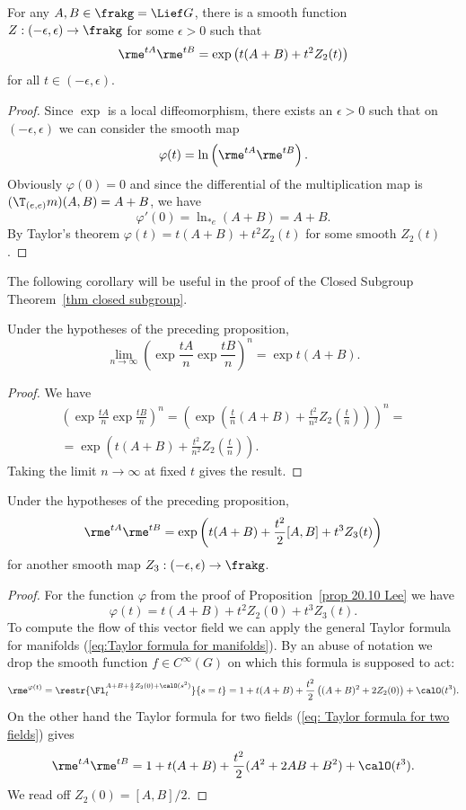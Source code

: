 \begin{prop}\label{prop 20.10 Lee}
    For any $A,B\in\frakg=\Lief G$, there is a smooth function $Z:(-\epsilon,\epsilon)\to \frakg$ for some $\epsilon>0$ such that
    \[\rme^{tA}\rme^{tB}=\exp\left(t(A+B)+t^2Z_2(t)\right)\]
    for all $t\in(-\epsilon,\epsilon)$.
\end{prop}
\begin{proof}
    Since $\exp$ is a local diffeomorphism, there exists an $\epsilon>0$ such that on $(-\epsilon,\epsilon)$ we can consider the smooth map
    \[\varphi(t)=\ln\left(\rme^{tA}\rme^{tB}\right).\]
    Obviously $\varphi(0)=0$ and since the differential of the multiplication map is $(\T_{(e,e)}m)(A,B)=A+B$, we have
    \[\varphi'(0)=\ln_{\ast e}(A+B)=A+B.\]
    By Taylor's theorem $\varphi(t)=t(A+B)+t^2Z_2(t)$ for some smooth $Z_2(t)$.
\end{proof}
The following corollary will be useful in the proof of the Closed Subgroup Theorem~\ref{thm closed subgroup}.
\begin{cor}\label{cor 20.11 Lee}
    Under the hypotheses of the preceding proposition,
    \[\lim_{n\to\infty}\left(\exp \frac{tA}{n}\exp \frac{tB}{n}\right)^n=\exp t(A+B).\]
\end{cor}
\begin{proof}
    We have 
    \begin{multline}
        \left(\exp \frac{tA}{n}\exp \frac{tB}{n}\right)^n=\left(\exp\left(\frac{t}{n}(A+B)+\frac{t^2}{n^2}Z_2\left(\frac{t}{n}\right)\right)\right)^n=\\
        =\exp\left(t(A+B)+\frac{t^2}{n^2}Z_2\left(\frac tn\right)\right).
    \end{multline}
    Taking the limit $n\to\infty$ at fixed $t$ gives the result.
\end{proof}

\begin{prop}
    Under the hypotheses of the preceding proposition, 
    \[\rme^{tA}\rme^{tB}=\exp\left(t(A+B)+\frac{t^2}{2}[A,B]+t^3Z_3(t)\right)\]
    for another smooth map $Z_3:(-\epsilon,\epsilon)\to \frakg$.
\end{prop}
\begin{proof}
    For the function $\varphi$ from the proof of Proposition~\ref{prop 20.10 Lee} we have
    \[\varphi(t)=t(A+B)+t^2Z_2(0)+t^3Z_3(t).\]
    To compute the flow of this vector field we can apply the general Taylor formula for manifolds (\ref{eq:Taylor formula for manifolds}). By an abuse of notation we drop the smooth function $f\in C^\infty(G)$ on which this formula is supposed to act:
    \[\rme^{\varphi(t)}=\restr{\Fl^{A+B+\frac{s}{2}Z_2(0)+\calO(s^2)}_t}{s=t}=1+t(A+B)+\frac{t^2}{2}\left((A+B)^2+2Z_2(0)\right)+\calO(t^3).\]
    On the other hand the Taylor formula for two fields (\ref{eq: Taylor formula for two fields}) gives
    \[\rme^{tA}\rme^{tB}=1+t(A+B)+\frac{t^2}{2}(A^2+2AB+B^2)+\calO(t^3).\]
    We read off $Z_2(0)=[A,B]/2$.
\end{proof}

